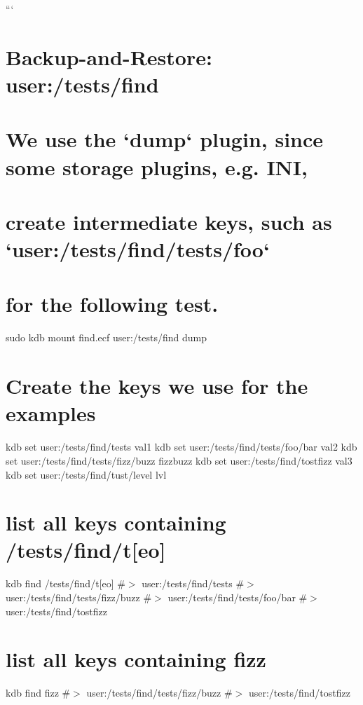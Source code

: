 ``` \hypertarget{doc_help_kdb-find_md_autotoc_md2672}{}\section{Backup-\/and-\/\+Restore\+: user\+:/tests/find}\label{doc_help_kdb-find_md_autotoc_md2672}
\hypertarget{doc_help_kdb-find_md_autotoc_md2673}{}\section{We use the `dump` plugin, since some storage plugins, e.\+g. I\+N\+I,}\label{doc_help_kdb-find_md_autotoc_md2673}
\hypertarget{doc_help_kdb-find_md_autotoc_md2674}{}\section{create intermediate keys, such as `user\+:/tests/find/tests/foo`}\label{doc_help_kdb-find_md_autotoc_md2674}
\hypertarget{doc_help_kdb-find_md_autotoc_md2675}{}\section{for the following test.}\label{doc_help_kdb-find_md_autotoc_md2675}
sudo kdb mount find.\+ecf user\+:/tests/find dump\hypertarget{doc_help_kdb-find_md_autotoc_md2676}{}\section{Create the keys we use for the examples}\label{doc_help_kdb-find_md_autotoc_md2676}
kdb set user\+:/tests/find/tests val1 kdb set user\+:/tests/find/tests/foo/bar val2 kdb set user\+:/tests/find/tests/fizz/buzz fizzbuzz kdb set user\+:/tests/find/tostfizz val3 kdb set user\+:/tests/find/tust/level lvl\hypertarget{doc_help_kdb-find_md_autotoc_md2677}{}\section{list all keys containing /tests/find/t\mbox{[}eo\mbox{]}}\label{doc_help_kdb-find_md_autotoc_md2677}
kdb find \textquotesingle{}/tests/find/t\mbox{[}eo\mbox{]}\textquotesingle{} \#$>$ user\+:/tests/find/tests \#$>$ user\+:/tests/find/tests/fizz/buzz \#$>$ user\+:/tests/find/tests/foo/bar \#$>$ user\+:/tests/find/tostfizz\hypertarget{doc_help_kdb-find_md_autotoc_md2678}{}\section{list all keys containing fizz}\label{doc_help_kdb-find_md_autotoc_md2678}
kdb find \textquotesingle{}fizz\textquotesingle{} \#$>$ user\+:/tests/find/tests/fizz/buzz \#$>$ user\+:/tests/find/tostfizz


